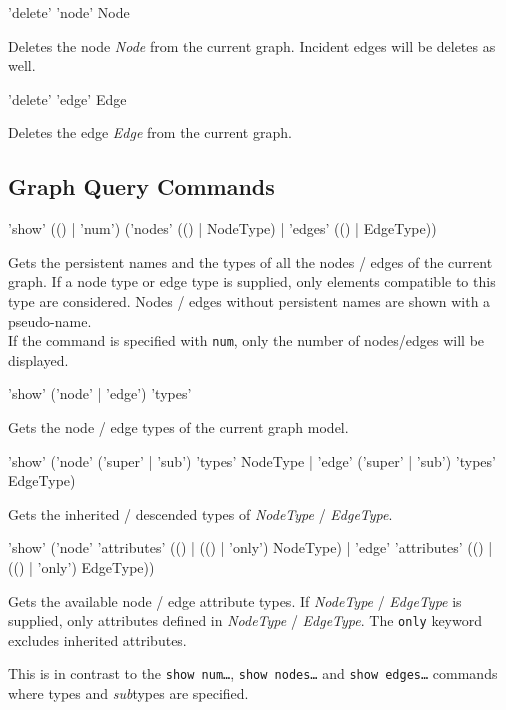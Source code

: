 \begin{rail}
  'delete' 'node' Node
\end{rail}
Deletes the node \emph{Node} from the current graph. Incident edges will be deletes as well.

\begin{rail}
  'delete' 'edge' Edge
\end{rail}
Deletes the edge \emph{Edge} from the current graph.  
  
\subsection{Graph Query Commands}

\begin{rail}
  'show' (() | 'num') ('nodes' (() | NodeType) | 'edges' (() | EdgeType))
\end{rail}
Gets the persistent names and the types of all the nodes / edges of the current graph. If a node type or edge type is supplied, only elements compatible to this type are considered. Nodes / edges without persistent names are shown with a pseudo-name.\\
If the command is specified with \texttt{num}, only the number of nodes/edges will be displayed.

\begin{rail}
  'show' ('node' | 'edge') 'types'
\end{rail}
Gets the node / edge types of the current graph model.

\begin{rail}
'show' ('node' ('super' | 'sub') 'types' NodeType | 'edge' ('super' | 'sub') 'types' EdgeType)
\end{rail}
Gets the inherited / descended types of \emph{NodeType} / \emph{EdgeType}.

\begin{rail}
  'show' ('node' 'attributes' (() | (() | 'only') NodeType) | 'edge' 'attributes' (() | (() | 'only') EdgeType))
\end{rail}
Gets the available node / edge attribute types. If \emph{NodeType} / \emph{EdgeType} is supplied, only attributes defined in \emph{NodeType} / \emph{EdgeType}. The \texttt{only} keyword excludes inherited attributes.\\
\begin{note}
This is in contrast to the \texttt{show num\dots}, \texttt{show nodes\dots} and \texttt{show edges\dots} commands where types and \emph{sub}types are specified.
\end{note}

